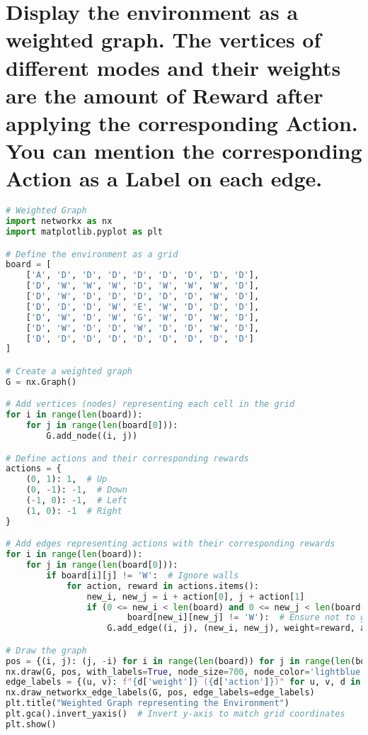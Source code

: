 \documentclass[12pt,onecolumn,a4paper]{article}
\begin{document}
\section{ Display the environment as a weighted graph. The vertices of different modes and their weights are the amount of Reward after applying the corresponding Action. You can mention the corresponding Action as a Label on each edge.}

\begin{lstlisting}[language=Python]
# Weighted Graph
import networkx as nx
import matplotlib.pyplot as plt

# Define the environment as a grid
board = [
    ['A', 'D', 'D', 'D', 'D', 'D', 'D', 'D', 'D'],
    ['D', 'W', 'W', 'W', 'D', 'W', 'W', 'W', 'D'],
    ['D', 'W', 'D', 'D', 'D', 'D', 'D', 'W', 'D'],
    ['D', 'D', 'D', 'W', 'E', 'W', 'D', 'D', 'D'],
    ['D', 'W', 'D', 'W', 'G', 'W', 'D', 'W', 'D'],
    ['D', 'W', 'D', 'D', 'W', 'D', 'D', 'W', 'D'],
    ['D', 'D', 'D', 'D', 'D', 'D', 'D', 'D', 'D']
]

# Create a weighted graph
G = nx.Graph()

# Add vertices (nodes) representing each cell in the grid
for i in range(len(board)):
    for j in range(len(board[0])):
        G.add_node((i, j))

# Define actions and their corresponding rewards
actions = {
    (0, 1): 1,  # Up
    (0, -1): -1,  # Down
    (-1, 0): -1,  # Left
    (1, 0): -1  # Right
}

# Add edges representing actions with their corresponding rewards
for i in range(len(board)):
    for j in range(len(board[0])):
        if board[i][j] != 'W':  # Ignore walls
            for action, reward in actions.items():
                new_i, new_j = i + action[0], j + action[1]
                if (0 <= new_i < len(board) and 0 <= new_j < len(board[0]) and
                        board[new_i][new_j] != 'W'):  # Ensure not to go out of bounds or onto walls
                    G.add_edge((i, j), (new_i, new_j), weight=reward, action=action)

# Draw the graph
pos = {(i, j): (j, -i) for i in range(len(board)) for j in range(len(board[0]))}  # Position vertices
nx.draw(G, pos, with_labels=True, node_size=700, node_color='lightblue', font_size=8, font_weight='bold')
edge_labels = {(u, v): f"{d['weight']} ({d['action']})" for u, v, d in G.edges(data=True)}
nx.draw_networkx_edge_labels(G, pos, edge_labels=edge_labels)
plt.title("Weighted Graph representing the Environment")
plt.gca().invert_yaxis()  # Invert y-axis to match grid coordinates
plt.show()
\end{lstlisting}
\end{document}
